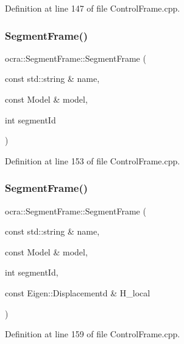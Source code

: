 Definition at line 147 of file Control\+Frame.\+cpp.

\hypertarget{classocra_1_1SegmentFrame_a01156da94eca5bf4961077a3310fc271}{}\label{classocra_1_1SegmentFrame_a01156da94eca5bf4961077a3310fc271} 
\subsubsection{\texorpdfstring{Segment\+Frame()}{SegmentFrame()}\hspace{0.1cm}{\footnotesize\ttfamily [3/4]}}
{\footnotesize\ttfamily ocra\+::\+Segment\+Frame\+::\+Segment\+Frame (\begin{DoxyParamCaption}\item[{const std\+::string \&}]{name,  }\item[{const Model \&}]{model,  }\item[{int}]{segment\+Id }\end{DoxyParamCaption})}



Definition at line 153 of file Control\+Frame.\+cpp.

\hypertarget{classocra_1_1SegmentFrame_a3864bc8263c40f7afa11de3c8c2dd76b}{}\label{classocra_1_1SegmentFrame_a3864bc8263c40f7afa11de3c8c2dd76b} 
\subsubsection{\texorpdfstring{Segment\+Frame()}{SegmentFrame()}\hspace{0.1cm}{\footnotesize\ttfamily [4/4]}}
{\footnotesize\ttfamily ocra\+::\+Segment\+Frame\+::\+Segment\+Frame (\begin{DoxyParamCaption}\item[{const std\+::string \&}]{name,  }\item[{const Model \&}]{model,  }\item[{int}]{segment\+Id,  }\item[{const Eigen\+::\+Displacementd \&}]{H\+\_\+local }\end{DoxyParamCaption})}



Definition at line 159 of file Control\+Frame.\+cpp.



